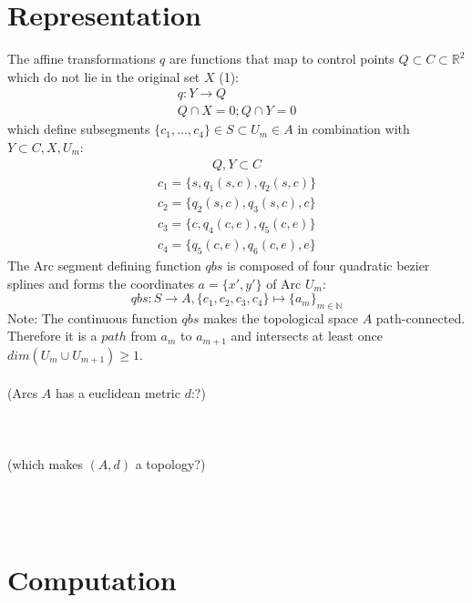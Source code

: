 \documentclass{article}
\begin{document}
\section{Representation}

The affine transformations $q$ are functions that map to control points $Q \subset C \subset \mathbb{R}^2$ which do not lie in the original set $X$ (1):
\begin{align}
q: Y \rightarrow Q\\
Q \cap X = 0; Q \cap Y = 0
\end{align}
which define subsegments $\{c_{1}, ... , c_{4}\} \in S \subset U_{m} \in A$ in combination with $Y \subset C, X, U_{m}$:
\begin{align*}
Q,Y \subset C
\end{align*}
\begin{align*}
c_{1}=\{s,q_{1}(s,c),q_{2}(s,c)\}\\
c_{2}=\{q_{2}(s,c),q_{3}(s,c),c\}\\
c_{3}=\{c,q_{4}(c,e),q_{5}(c,e)\}\\
c_{4}=\{q_{5}(c,e),q_{6}(c,e),e\}
\end{align*}
The Arc segment defining function $qbs$ is composed of four quadratic bezier splines and forms the coordinates $a=\{x',y'\}$ of Arc $U_{m}$:
\begin{equation}
qbs: S \rightarrow A, \{c_{1},c_{2},c_{3},c_{4}\} \mapsto \{a_{m}\}_{m \in \mathbb{N}}
\end{equation}
Note: The continuous function $qbs$ makes the topological space $A$ path-connected. Therefore it is a $path$ from $a_{m}$ to $a_{m+1}$ and intersects at least once $dim (U_{m} \cup U_{m+1}) \geq 1$. ~\cite[.3.]{Mortad}\\\\
(Arcs $A$ has a euclidean metric $d$:?)\\\\\\\\
(which makes $(A,d)$ a topology?)\\\\\\\\

\section{Computation}

\iffalse
\begin{equation} 
\forall u,v \in V :
d(u,v) = 
\begin{cases}
0,  u=v \\
1,  u \neq v 
\end{cases}
\end{equation}
\fi

\printbibliography
\end{document}
